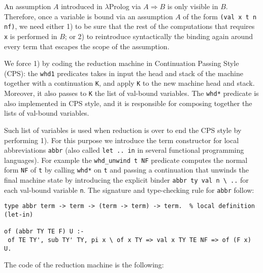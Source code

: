 An assumption $A$ introduced in $\lambda$Prolog via $A \Rightarrow B$ is only visible in $B$. Therefore, once a variable is bound via an assumption $A$ of the form \verb+(val x t n nf)+, we need either 1) to be sure that the rest of the computations that requires \verb+x+ is performed in $B$; or 2) to reintroduce syntactically the binding again around every term that escapes the scope of the assumption.

We force 1) by coding the reduction machine in Continuation Passing Style (CPS): the \verb+whd1+ predicates takes in input the head and stack of the machine together with a continuation \verb+K+, and apply \verb+K+ to the new machine head and stack. Moreover, it also passes to \verb+K+ the list of val-bound variables.
The \verb+whd*+ predicate is also implemented in CPS style, and it is responsible for composing together the lists of val-bound variables.

Such list of variables is used when reduction is over to end the CPS style by performing 1).  For this purpose we introduce the term constructor for local abbreviations \verb+abbr+ (also called \verb+let .. in+ in several functional programming languages).  For example the \verb+whd_unwind t NF+ predicate computes the normal form \verb+NF+ of \verb+t+ by calling \verb+whd*+ on \verb+t+ and passing a continuation that unwinds the final machine state by introducing the explicit binder \verb+abbr ty val n \ ..+ for each val-bound variable \verb+n+.  The signature and type-checking rule for \verb+abbr+ follow:

\begin{Verbatim}
type abbr term -> term -> (term -> term) -> term.  % local definition (let-in)

of (abbr TY TE F) U :-
 of TE TY', sub TY' TY, pi x \ of x TY => val x TY TE NF => of (F x) U.
\end{Verbatim}

The code of the reduction machine is the following:


